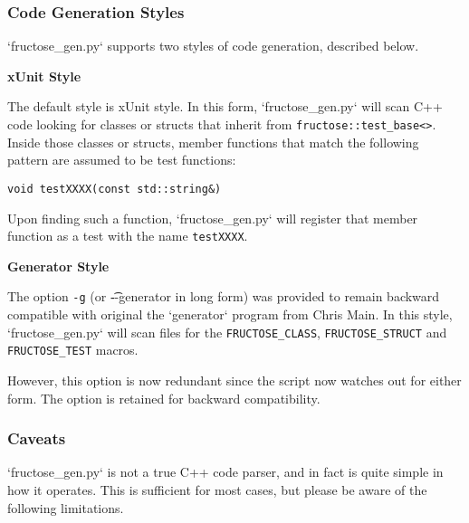 \documentclass{book}
\begin{document}
\subsubsection{Code Generation Styles}
`fructose\_gen.py` supports two styles of code generation, described below.

\hfil\break
{\bf xUnit Style}\hfil\break

The default style is xUnit style. In this form, `fructose\_gen.py` will scan
C++ code looking for classes or structs that inherit 
from {\tt fructose::test\_base<>}.
Inside those classes or structs, member functions that match the following
pattern are assumed to be test functions:

\begin{verbatim}
void testXXXX(const std::string&)
\end{verbatim}

Upon finding such a function, `fructose\_gen.py` will register that member
function as a test with the name {\tt testXXXX}. 

\hfil\break
{\bf Generator Style}\hfil\break

The option {\tt -g} (or {\t --generator} in long form)
was provided to remain backward compatible with original the `generator` program 
from Chris Main. 
In this style, `fructose\_gen.py` will scan files for the 
{\tt FRUCTOSE\_CLASS}, {\tt FRUCTOSE\_STRUCT} 
and {\tt FRUCTOSE\_TEST} macros.

However, this option is now redundant since the script now
watches out for either form.
The option is retained for backward compatibility.

\subsubsection{Caveats}

`fructose\_gen.py` is not a true C++ code parser, and in fact is quite simple
in how it operates. This is sufficient for most cases, but please be aware of
the following limitations.
\end{document}
